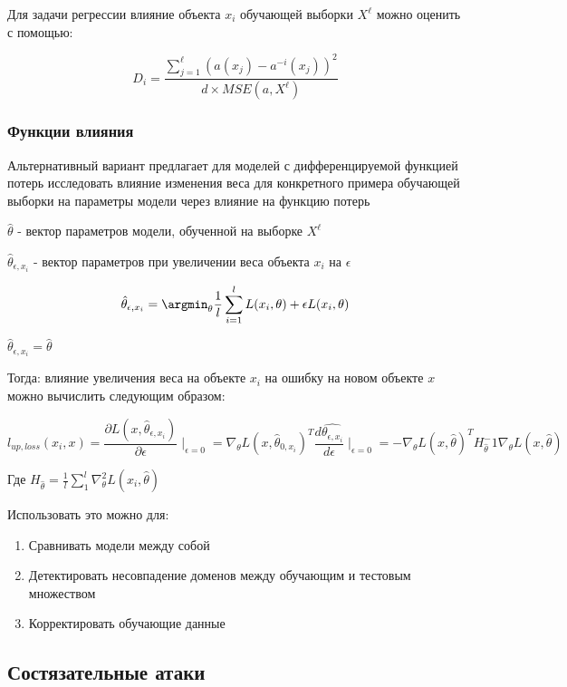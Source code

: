 \documentclass[a4paper, 12pt]{article}
\begin{document}
Для задачи регрессии влияние объекта $x_i$ обучающей выборки $X^{\ell}$
можно оценить с помощью:

\[D_i = \frac{\sum_{j = 1}^{\ell} (a(x_j) - a^{-i}(x_j))^2}
{d \times MSE(a, X^{\ell})}\]

\subsubsection{Функции влияния}

Альтернативный вариант предлагает для моделей
с дифференцируемой функцией потерь исследовать
влияние изменения веса для конкретного примера
обучающей выборки на параметры модели через 
влияние на функцию потерь

$\hat{\theta}$ - вектор параметров модели, обученной на выборке $X^{\ell}$

$\hat{\theta}_{\epsilon, x_i}$ - вектор параметров при увеличении
веса объекта $x_i$ на $\epsilon$

\[\hat{\theta}_{\epsilon, x_i} = \argmin_{\theta} 
\frac{1}{l}\sum_{i = 1}^{l} L(x_i, \theta) + \epsilon L(x_i, \theta)\]

$\hat{\theta}_{\epsilon, x_i} = \hat{\theta}$

Тогда: влияние увеличения веса на объекте $x_i$ на ошибку
на новом объекте $x$ можно вычислить следующим образом:

\[l_{up, loss}(x_i, x) = \frac{\partial L(x, \hat{\theta}_{\epsilon, x_i})}
{\partial \epsilon} \mid_{\epsilon = 0} 
= \nabla_{\theta}L(x, \hat{\theta}_{0, x_i})^T 
\frac{d\hat{\theta_{\epsilon, x_i}}}{d \epsilon} \mid_{\epsilon = 0}
= - \nabla_{\theta} L(x, \hat{\theta})^T H_{\hat{\theta}}^-1 
\nabla_{\theta} L(x, \hat{\theta})\]

Где $H_{\hat{\theta}} = \frac{1}{l} \sum_{1}^{l} \nabla_{\theta}^2 
L(x_i, \hat{\theta})$

Использовать это можно для:

\begin{enumerate}
    \item Сравнивать модели между собой
    \item Детектировать несовпадение доменов между обучающим и тестовым множеством
    \item Корректировать обучающие данные
\end{enumerate}

\subsection{Состязательные атаки}
\end{document}
